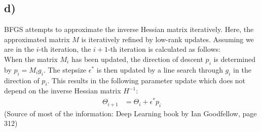 \documentclass[a4paper]{article}
\begin{document}
\newpage
    \subsection*{d)}
        BFGS attempts to approximate the inverse Hessian matrix iteratively.
        Here, the approximated matrix $M$ is iteratively refined by low-rank updates.
        Assuming we are in the $i$-th iteration, the $i+1$-th iteration is calculated as follows:\\
        When the matrix $M_i$ has been updated, the direction of descent $p_i$ is determined by $p_i = M_i g_i$.
        The stepsize $\epsilon^*$ is then updated by a line search through $g_i$ in the direction of $p_i$. This results in the following parameter update which does not depend on the inverse Hessian matrix $H^{-1}$:
        \begin{align}
            \Theta_{i+1} &= \Theta_i + \epsilon^* p_i
        \end{align}
        (Source of most of the information: Deep Learning book by Ian Goodfellow, page 312)
\end{document}
